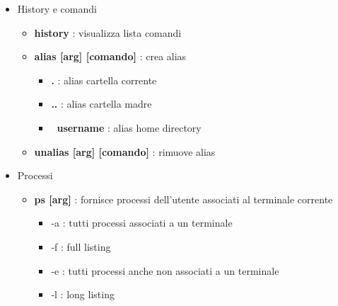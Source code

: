 \documentclass{article}
\begin{document}
\begin{itemize}
\begin{itemize}
            \item \textbf{quoting} : inibisce l'effetto dei metacaratteri

                \begin{itemize} %
                    \item \textbf{' [comando] ' }
                    \item \textbf{\textbackslash [metachar]}
                    \item \textbf{" [comando] "}
                \end{itemize} %
        \end{itemize} %


    \item History e comandi
        \begin{itemize} %
            \item \textbf{history} : visualizza lista comandi
            \item \textbf{alias [arg] [comando]} : crea alias
                \begin{itemize}
                    \item \textbf{.} : alias cartella corrente
                    \item \textbf{..} : alias cartella madre
                    \item \textbf{~username} : alias home directory
                \end{itemize}
            \item \textbf{unalias [arg] [comando]} : rimuove alias
        \end{itemize} %

    \item Processi
        \begin{itemize} %
            \item \textbf{ps [arg]} : fornisce processi dell'utente associati al terminale corrente
            \begin{itemize} %
                \item -a : tutti processi associati a un terminale
                \item -f : full listing
                \item -e : tutti processi anche non associati a un terminale
                \item -l : long listing
            \end{itemize} %


\end{itemize}
\end{itemize}
\end{document}
